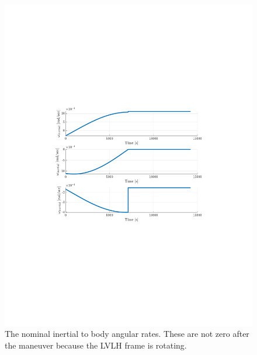 \documentclass[]{article}
\begin{document}
\begin{figure}[!h]
	\centering
	\includegraphics[width=\linewidth,trim={4cm, 8cm, 4cm, 8cm},clip]{figs/P1Q3.pdf}
	\caption{The nominal inertial to body angular rates. These are not zero after the maneuver because the LVLH frame is rotating.}
	\label{fig:P1Q3}
\end{figure}
\end{document}
